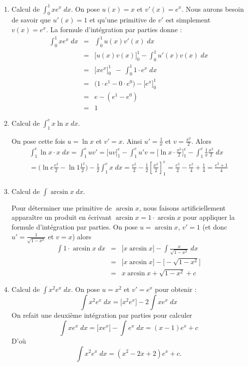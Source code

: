 \documentclass[class=report,crop=false]{standalone}
\begin{document}
\begin{exemple}
\sauteligne
\begin{enumerate}

  \item Calcul de $\int_0^1 x e^x \; dx$.
On pose $u(x)=x$ et $v'(x)=e^x$.
Nous aurons besoin de savoir que $u'(x)=1$ et qu'une primitive de $v'$ est simplement $v(x)=e^x$.
La formule d'intégration par parties donne :
$$
\begin{array}{rcl}
\int_0^1 x e^x \; dx
  & = & \int_0^1 u(x)v'(x)\;dx \\
  & = & \big[u(x)v(x)\big]_0^1 - \int_0^1 u'(x)v(x)\;dx \\
  & = & \big[x e^x\big]_0^1 \ \  - \  \int_0^1 1\cdot e^x \;dx \\
  & = & \big(1\cdot e^1-0\cdot e^0\big) - \big[e^x\big]_0^1 \\
  & = & e -(e^1-e^0) \\
  & = & 1
\end{array}
$$

  \item Calcul de $\int_1^e x\ln x \; dx$.

On pose cette fois $u=\ln x$ et $v'=x$. Ainsi
$u'=\frac1x$ et $v=\frac{x^2}{2}$.
Alors
\begin{align*}
\int_1^e \ln x \cdot  x\; dx
= \int_1^e  uv' = \big[uv\big]_1^e - \int_1^e u'v
= \big[\ln x \cdot\tfrac{x^2}{2}\big]_1^e - \int_1^e \tfrac 1x \tfrac{x^2}{2} \; dx \\
= \big(\ln e \tfrac{e^2}{2} - \ln 1 \tfrac{1^2}{2} \big) - \tfrac12 \int_1^e x  \; dx
= \tfrac{e^2}{2} -\frac12 \left[ \tfrac{x^2}{2} \right]_1^e
= \tfrac{e^2}{2} - \tfrac{e^2}{4} + \tfrac{1}{4} = \tfrac{e^2+1}{4}\\
\end{align*}



  \item Calcul de $\int \arcsin x \; dx$.

Pour déterminer une primitive de $\arcsin x$,
nous faisons artificiellement apparaître un produit en écrivant $\arcsin x = 1 \cdot \arcsin x$
pour appliquer la formule d'intégration par parties.
On pose $u=\arcsin x$, $v'=1$ (et donc $u'=\frac{1}{\sqrt{1-x^2}}$ et $v=x$) alors
\begin{eqnarray*}
\int 1\cdot \arcsin x \; dx 
  &=& \big[x\arcsin x\big] - \int \frac{x}{\sqrt{1-x^2}} \; dx \\
  &=& \big[x\arcsin x\big] - \big[-\sqrt {1-x^2}\big] \\
  &=& x\arcsin x+ \sqrt {1-x^2}+c
\end{eqnarray*}

  \item Calcul de $\int x^2e^x \; dx$.
On pose $u=x^2$ et $v'=e^x$ pour obtenir :
$$\int x^2e^x \; dx = \big[ x^2e^x \big] - 2\int x e^x \; dx$$
On refait une deuxième intégration par parties pour calculer
$$\int x e^x \; dx = \big[x e^x\big] - \int e^x \; dx = (x-1)e^x+c$$
D'où
$$\int x^2e^x \; dx = (x^2-2x+2) e^x + c.$$
\end{enumerate}
\end{exemple}
\end{document}
